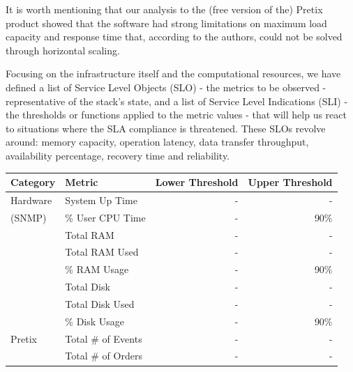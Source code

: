 \documentclass[12pt]{article}
\begin{document}
It is worth mentioning that our analysis to the (free version of the) Pretix product showed that the software had strong limitations on maximum load capacity 
and response time that, according to the authors, could not be solved through horizontal scaling.

Focusing on the infrastructure itself and the computational resources, we have defined a list of Service Level Objects (SLO) - the metrics to be observed - 
representative of the stack's state, and a list of Service Level Indications (SLI) - the thresholds or functions applied to the metric values - that will
help us react to situations where the SLA compliance is threatened.
These SLOs revolve around: memory capacity, operation latency, data transfer throughput, availability percentage, recovery time and reliability.

\begin{table}[h!]
  \begin{center}
    \begin{tabular}{l|l|r|r}
      \hline
      \textbf{Category}   & \textbf{Metric}         & \textbf{Lower Threshold}  & \textbf{Upper Threshold}  \\
      \hline 
      Hardware            & System Up Time          & -                         & -                         \\
      (SNMP)              & \% User CPU Time        & -                         & 90\%                      \\
                          & Total RAM               & -                         & -                         \\
                          & Total RAM Used          & -                         & -                         \\
                          & \% RAM Usage            & -                         & 90\%                      \\
                          & Total Disk              & -                         & -                         \\
                          & Total Disk Used         & -                         & -                         \\
                          & \% Disk Usage           & -                         & 90\%                      \\
      \hline
      Pretix              & Total \# of Events      & -                         & -                         \\
                          & Total \# of Orders      & -                         & -                         \\

\end{tabular}
\end{center}
\end{table}
\end{document}
